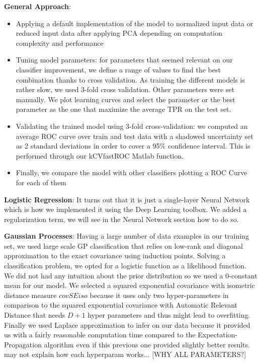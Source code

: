 \documentclass{article}
\begin{document}
   \textbf{General Approach}: 
     	\begin{itemize}
		\item Applying a default implementation of the model to normalized input data or reduced input data after applying PCA depending on computation complexity and performance
    		\item Tuning model parameters: for parameters that seemed relevant on our classifier improvement, we define a range of values to find the best combination thanks to cross validation. As training the different models is rather slow, we used 3-fold cross validation. Other parameters were set manually. We plot learning curves and select the parameter or the best parameter as the one that maximize the average TPR on the test set.
		\item Validating the trained model using 3-fold cross-validation: we computed an average ROC curve over train and test data with a shadowed uncertainty set as 2 standard deviations in order to cover a 95\% confidence interval. This is performed through our kCVfastROC Matlab function.
		\item Finally, we compare the model with other classifiers plotting a ROC Curve for each of them
	\end{itemize}
   
   \textbf{Logistic Regression}: It turns out that it is just a single-layer Neural Network which is how we implemented it using the Deep Learning toolbox. We added a regularization term, we will see in the Neural Network section how to do so.
      
   \textbf{Gaussian Processes}: Having a large number of data examples in our training set, we used large scale GP classification that relies on low-rank and diagonal approximation to the exact covariance using induction points. Solving a classification problem, we opted for a logistic function as a likelihood function. We did not had any intuition about the prior distribution so we used a 0-constant mean for our model. We selected a squared exponential covariance with isometric distance measure $covSEiso$ because it uses only two hyper-parameters in comparison to the squared exponential covariance with Automatic Relevant Distance that needs $D+1$ hyper parameters and thus might lead to overfitting. Finally we used Laplace approximation to infer on our data because it provided us with a fairly reasonable computation time compared to the Expectation-Propagation algorithm even if this previous one provided slightly better results.
   ~ may not explain how each hyperparam works... [WHY ALL PARAMETERS?]
   
\end{document}
